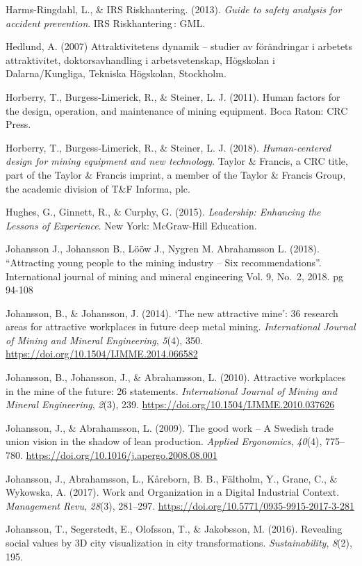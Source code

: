 \documentclass[
  12pt,
]{scrbook}
\begin{document}
Harms-Ringdahl, L., \& IRS Riskhantering. (2013). \emph{Guide to safety
analysis for accident prevention}. IRS Riskhantering\,: GML.

Hedlund, A. (2007) Attraktivitetens dynamik -- studier av förändringar i
arbetets attraktivitet, doktorsavhandling i arbetsvetenskap, Högskolan i
Dalarna/Kungliga, Tekniska Högskolan, Stockholm.

Horberry, T., Burgess-Limerick, R., \& Steiner, L. J. (2011). Human
factors for the design, operation, and maintenance of mining equipment.
Boca Raton: CRC Press.

Horberry, T., Burgess-Limerick, R., \& Steiner, L. J. (2018).
\emph{Human-centered design for mining equipment and new technology}. Taylor
\& Francis, a CRC title, part of the Taylor \& Francis imprint, a member
of the Taylor \& Francis Group, the academic division of T\&F Informa,
plc.

Hughes, G., Ginnett, R., \& Curphy, G. (2015). \emph{Leadership: Enhancing the
Lessons of Experience}. New York: McGraw-Hill Education.

Johansson J., Johansson B., Lööw J., Nygren M. Abrahamsson L. (2018).
``Attracting young people to the mining industry -- Six recommendations''.
International journal of mining and mineral engineering Vol. 9, No.~2,
2018. pg 94-108

Johansson, B., \& Johansson, J. (2014). `The new attractive mine': 36
research areas for attractive workplaces in future deep metal mining.
\emph{International Journal of Mining and Mineral Engineering}, \emph{5}(4), 350.
\url{https://doi.org/10.1504/IJMME.2014.066582}

Johansson, B., Johansson, J., \& Abrahamsson, L. (2010). Attractive
workplaces in the mine of the future: 26 statements. \emph{International
Journal of Mining and Mineral Engineering}, \emph{2}(3), 239.
\url{https://doi.org/10.1504/IJMME.2010.037626}

Johansson, J., \& Abrahamsson, L. (2009). The good work -- A Swedish
trade union vision in the shadow of lean production. \emph{Applied
Ergonomics}, \emph{40}(4), 775--780.
\url{https://doi.org/10.1016/j.apergo.2008.08.001}

Johansson, J., Abrahamsson, L., Kåreborn, B. B., Fältholm, Y., Grane,
C., \& Wykowska, A. (2017). Work and Organization in a Digital Industrial
Context. \emph{Management Revu}, \emph{28}(3), 281--297.
\url{https://doi.org/10.5771/0935-9915-2017-3-281}

Johansson, T., Segerstedt, E., Olofsson, T., \& Jakobsson, M. (2016).
Revealing social values by 3D city visualization in city
transformations. \emph{Sustainability}, \emph{8}(2), 195.
\end{document}
